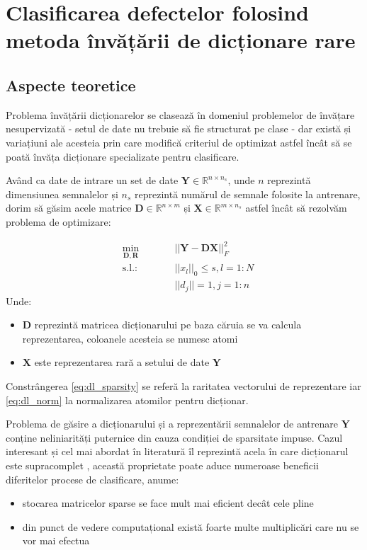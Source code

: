 \chapter{Clasificarea defectelor folosind metoda învățării de dicționare rare}
\label{chap:dictionary_learning}
\section{Aspecte teoretice}
Problema învățării dicționarelor se clasează în domeniul problemelor de învățare nesupervizată - setul de date nu trebuie să fie structurat pe clase - dar există și variațiuni ale acesteia prin care modifică criteriul de optimizat astfel încât să se poată învăța dicționare specializate pentru clasificare.

Având ca date de intrare un set de date $\mathbf{Y} \in \mathbb{R}^{n \times n_s}$, unde $n$ reprezintă dimensiunea semnalelor și $n_s$ reprezintă numărul de semnale folosite la antrenare, dorim să găsim acele matrice $\mathbf{D} \in \mathbb{R}^{n \times m}$ și $\mathbf{X} \in \mathbb{R}^{m \times n_s}$ astfel încât să rezolvăm problema de optimizare\cite[Capitol 2]{DL_book}:

\begin{subequations}
\begin{alignat}{2}
&\!\min_{\mathbf{D}, \mathbf{R}}        &\qquad& ||\mathbf{Y} - \mathbf{D} \mathbf{X} ||^{2}_{F} \label{eq:dl_opt}\\
&\text{s.l.:} &      & ||x_l||_0  \leq s, l = 1:N \label{eq:dl_sparsity}\\
& & & ||d_j|| = 1, j = 1:n \label{eq:dl_norm}
\end{alignat}
\label{eq:dl_opt_problem}
\end{subequations}
Unde:
\begin{itemize}
    \item $\mathbf{D}$ reprezintă matricea dicționarului pe baza căruia se va calcula reprezentarea, coloanele acesteia se numesc atomi
    \item $\mathbf{X}$ este reprezentarea rară a setului de date $\mathbf{Y}$
\end{itemize}

Constrângerea \eqref{eq:dl_sparsity} se referă la raritatea vectorului de reprezentare iar \eqref{eq:dl_norm} la normalizarea atomilor pentru dicționar.

Problema de găsire a dicționarului și a reprezentării semnalelor de antrenare $\mathbf{Y}$ conține neliniarități puternice din cauza condiției de sparsitate impuse. Cazul interesant și cel mai abordat în literatură îl reprezintă acela în care dicționarul este supracomplet \cite[Capitolul 1]{DL_book}, această proprietate poate aduce numeroase beneficii diferitelor procese de clasificare, anume:
\begin{itemize}
    \item stocarea matricelor sparse se face mult mai eficient decât cele pline
    \item din punct de vedere computațional există foarte multe multiplicări care nu se vor mai efectua
\end{itemize}

